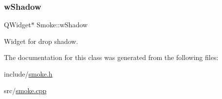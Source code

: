 \mbox{\label{classSmoke_aa6b959618b43da0106cc49148be321e8}} 
\subsubsection{\texorpdfstring{wShadow}{wShadow}}
{\footnotesize\ttfamily Q\+Widget$\ast$ Smoke\+::w\+Shadow\hspace{0.3cm}{\ttfamily [private]}}



Widget for drop shadow. 



The documentation for this class was generated from the following files\+:\begin{DoxyCompactItemize}
\item 
include/\mbox{\hyperlink{smoke_8h}{smoke.\+h}}\item 
src/\mbox{\hyperlink{smoke_8cpp}{smoke.\+cpp}}\end{DoxyCompactItemize}
